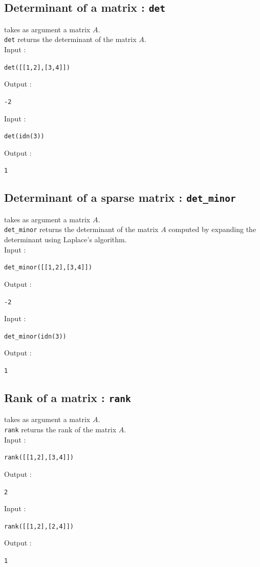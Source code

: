\documentclass[a4paper,11pt]{book}
\begin{document}
\subsection{Determinant of a matrix : {\tt det}}
 takes as argument a matrix $A$.\\
{\tt det} returns the determinant of the matrix $A$.\\
Input :
\begin{center}{\tt det([[1,2],[3,4]])}\end{center}
Output :
\begin{center}{\tt -2}\end{center}
Input :
\begin{center}{\tt det(idn(3))}\end{center}
Output :
\begin{center}{\tt 1}\end{center}

\subsection{Determinant of a sparse matrix : {\tt det\_minor}}
 takes as argument a matrix $A$.\\
{\tt det\_minor} returns the determinant of the matrix $A$ computed by 
expanding the determinant using Laplace's algorithm.\\
Input :
\begin{center}{\tt det\_minor([[1,2],[3,4]])}\end{center}
Output :
\begin{center}{\tt -2}\end{center}
Input :
\begin{center}{\tt det\_minor(idn(3))}\end{center}
Output :
\begin{center}{\tt 1}\end{center}

\subsection{Rank of a matrix : {\tt rank}}
 takes as argument a matrix $A$.\\
{\tt rank} returns the rank of the matrix $A$.\\
Input :
\begin{center}{\tt rank([[1,2],[3,4]])}\end{center}
Output :
\begin{center}{\tt 2}\end{center}
Input :
\begin{center}{\tt rank([[1,2],[2,4]])}\end{center}
Output :
\begin{center}{\tt 1}\end{center}
\end{document}

